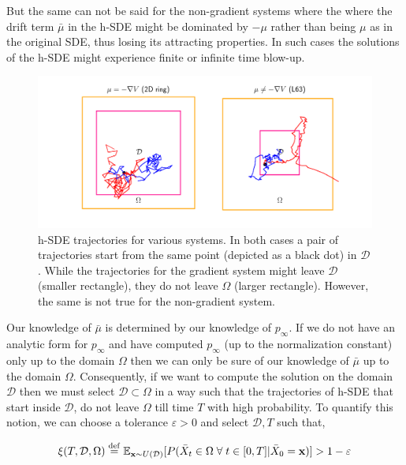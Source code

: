 But the same can not be said for the non-gradient systems where the where the drift term $\bar{\mu}$ in the h-SDE might be dominated by $-\mu$ rather than being $\mu$ as in the original SDE, thus losing its attracting properties. In such cases the solutions of the h-SDE might experience finite or infinite time blow-up.
\begin{figure}[!ht]
    \centering
\includegraphics[scale=0.55]{dynamic-fp/plots/dynamic-plots-h-SDE.png}
    \caption{h-SDE trajectories for various systems. In both cases a pair of trajectories start from the same point (depicted as a black dot) in $\mathcal D$. While the trajectories for the gradient system might leave $\mathcal D$ (smaller rectangle), they do not leave $\Omega$ (larger rectangle). However, the same is not true for the non-gradient system.}
    \label{fig:h-SDE--dynamic-fp}
\end{figure}

Our knowledge of $\bar{\mu}$ is determined by our knowledge of $p_\infty$. If we do not have an analytic form for $p_\infty$ and have computed $p_\infty$ (up to the normalization constant) only up to the domain $\Omega$ then we can only be sure of our knowledge of $\bar{\mu}$ up to the domain $\Omega$. Consequently, if we want to compute the solution on the domain $\mathcal D$ then we must select $\mathcal D\subset\Omega$ in a way such that the trajectories of h-SDE that start inside $\mathcal D$, do not leave $\Omega$ till time $T$ with high probability. To quantify this notion, we can choose a tolerance $\varepsilon>0$ and select $\mathcal D, T$ such that,


\begin{align}
    \xi(T, \mathcal D, \Omega)\stackrel{\rm def}{=}\mathbb E_{\mathbf x\sim U(\mathcal D)}[P(\bar X_t\in\Omega\;\forall\;t\in[0, T]|\bar X_0=\mathbf x)] > 1-\varepsilon\label{eq:xi-defn--dynamic-fp}
\end{align}


